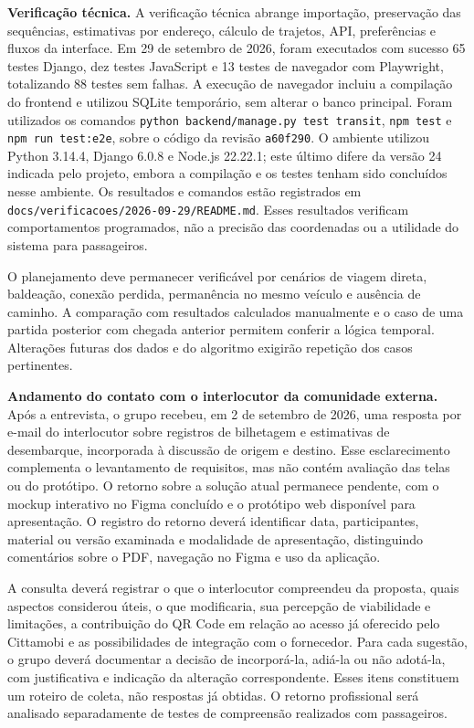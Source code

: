 \documentclass[12pt,oneside,a4paper,brazil]{abntex2}
\begin{document}
\textbf{Verificação técnica.} A verificação técnica abrange importação, preservação das sequências, estimativas por endereço, cálculo de trajetos, API, preferências e fluxos da interface. Em 29 de setembro de 2026, foram executados com sucesso 65 testes Django, dez testes JavaScript e 13 testes de navegador com Playwright, totalizando 88 testes sem falhas. A execução de navegador incluiu a compilação do frontend e utilizou SQLite temporário, sem alterar o banco principal. Foram utilizados os comandos \texttt{python backend/manage.py test transit}, \texttt{npm test} e \texttt{npm run test:e2e}, sobre o código da revisão \texttt{a60f290}. O ambiente utilizou Python 3.14.4, Django 6.0.8 e Node.js 22.22.1; este último difere da versão 24 indicada pelo projeto, embora a compilação e os testes tenham sido concluídos nesse ambiente. Os resultados e comandos estão registrados em \nolinkurl{docs/verificacoes/2026-09-29/README.md}. Esses resultados verificam comportamentos programados, não a precisão das coordenadas ou a utilidade do sistema para passageiros.

O planejamento deve permanecer verificável por cenários de viagem direta, baldeação, conexão perdida, permanência no mesmo veículo e ausência de caminho. A comparação com resultados calculados manualmente e o caso de uma partida posterior com chegada anterior permitem conferir a lógica temporal. Alterações futuras dos dados e do algoritmo exigirão repetição dos casos pertinentes.

\textbf{Andamento do contato com o interlocutor da comunidade externa.} Após a entrevista, o grupo recebeu, em 2 de setembro de 2026, uma resposta por e-mail do interlocutor sobre registros de bilhetagem e estimativas de desembarque, incorporada à discussão de origem e destino. Esse esclarecimento complementa o levantamento de requisitos, mas não contém avaliação das telas ou do protótipo. O retorno sobre a solução atual permanece pendente, com o mockup interativo no Figma concluído e o protótipo web disponível para apresentação. O registro do retorno deverá identificar data, participantes, material ou versão examinada e modalidade de apresentação, distinguindo comentários sobre o PDF, navegação no Figma e uso da aplicação.

A consulta deverá registrar o que o interlocutor compreendeu da proposta, quais aspectos considerou úteis, o que modificaria, sua percepção de viabilidade e limitações, a contribuição do QR Code em relação ao acesso já oferecido pelo Cittamobi e as possibilidades de integração com o fornecedor. Para cada sugestão, o grupo deverá documentar a decisão de incorporá-la, adiá-la ou não adotá-la, com justificativa e indicação da alteração correspondente. Esses itens constituem um roteiro de coleta, não respostas já obtidas. O retorno profissional será analisado separadamente de testes de compreensão realizados com passageiros.
\end{document}
